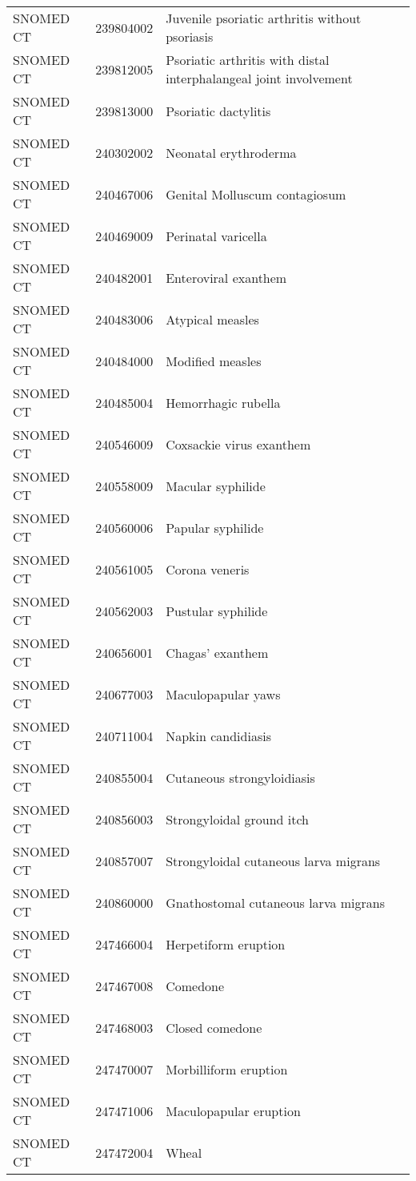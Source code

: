 \begin{longtable}{p{}p{}p{}}
  SNOMED CT & 239804002 & Juvenile psoriatic arthritis without psoriasis \\ 
  SNOMED CT & 239812005 & Psoriatic arthritis with distal interphalangeal joint involvement \\ 
  SNOMED CT & 239813000 & Psoriatic dactylitis \\ 
  SNOMED CT & 240302002 & Neonatal erythroderma \\ 
  SNOMED CT & 240467006 & Genital Molluscum contagiosum \\ 
  SNOMED CT & 240469009 & Perinatal varicella \\ 
  SNOMED CT & 240482001 & Enteroviral exanthem \\ 
  SNOMED CT & 240483006 & Atypical measles \\ 
  SNOMED CT & 240484000 & Modified measles \\ 
  SNOMED CT & 240485004 & Hemorrhagic rubella \\ 
  SNOMED CT & 240546009 & Coxsackie virus exanthem \\ 
  SNOMED CT & 240558009 & Macular syphilide \\ 
  SNOMED CT & 240560006 & Papular syphilide \\ 
  SNOMED CT & 240561005 & Corona veneris \\ 
  SNOMED CT & 240562003 & Pustular syphilide \\ 
  SNOMED CT & 240656001 & Chagas' exanthem \\ 
  SNOMED CT & 240677003 & Maculopapular yaws \\ 
  SNOMED CT & 240711004 & Napkin candidiasis \\ 
  SNOMED CT & 240855004 & Cutaneous strongyloidiasis \\ 
  SNOMED CT & 240856003 & Strongyloidal ground itch \\ 
  SNOMED CT & 240857007 & Strongyloidal cutaneous larva migrans \\ 
  SNOMED CT & 240860000 & Gnathostomal cutaneous larva migrans \\ 
  SNOMED CT & 247466004 & Herpetiform eruption \\ 
  SNOMED CT & 247467008 & Comedone \\ 
  SNOMED CT & 247468003 & Closed comedone \\ 
  SNOMED CT & 247470007 & Morbilliform eruption \\ 
  SNOMED CT & 247471006 & Maculopapular eruption \\ 
  SNOMED CT & 247472004 & Wheal \\ 

\end{longtable}
